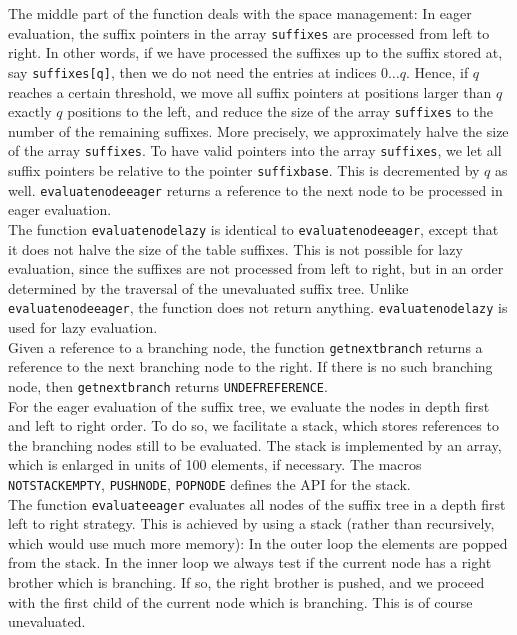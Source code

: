 \documentclass[a4paper]{article}
\begin{document}
The middle part of the function deals with the space management: In eager
evaluation, the suffix pointers in the array \texttt{suffixes} are processed
from left to right. In other words, if we have processed the suffixes up to the
suffix stored at, say \texttt{suffixes[q]}, then we do not need the entries at
indices \(0 \dots q\). Hence, if \(q\) reaches a certain threshold, we move all
suffix pointers at positions larger than \(q\) exactly \(q\) positions to the
left, and reduce the size of the array \texttt{suffixes} to the number of the
remaining suffixes. More precisely, we approximately halve the size of the
array \texttt{suffixes}. To have valid pointers into the array
\texttt{suffixes}, we let all suffix pointers be relative to the pointer
\texttt{suffixbase}. This is decremented by \(q\) as well.
\texttt{evaluatenodeeager} returns a reference to the next node to be processed
in eager evaluation.\\

The function \texttt{evaluatenodelazy} is identical to
\texttt{evaluatenodeeager}, except that it does not halve the size of the table
suffixes. This is not possible for lazy evaluation, since the suffixes are not
processed from left to right, but in an order determined by the traversal of
the unevaluated suffix tree. Unlike \texttt{evaluatenodeeager}, the function
does not return anything. \texttt{evaluatenodelazy} is used for lazy
evaluation.\\

Given a reference to a branching node, the function \texttt{getnextbranch}
returns a reference to the next branching node to the right. If there is no
such branching node, then \texttt{getnextbranch} returns
\texttt{UNDEFREFERENCE}.\\

For the eager evaluation of the suffix tree, we evaluate the nodes in depth
first and left to right order. To do so, we facilitate a stack, which stores
references to the branching nodes still to be evaluated. The stack is
implemented by an array, which is enlarged in units of 100 elements, if
necessary. The macros \texttt{NOTSTACKEMPTY}, \texttt{PUSHNODE},
\texttt{POPNODE} defines the API for the stack.\\

The function \texttt{evaluateeager} evaluates all nodes of the suffix tree in a
depth first left to right strategy. This is achieved by using a stack (rather
than recursively, which would use much more memory): In the outer loop the
elements are popped from the stack. In the inner loop we always test if the
current node has a right brother which is branching. If so, the right brother
is pushed, and we proceed with the first child of the current node which is
branching. This is of course unevaluated.\\
\end{document}
